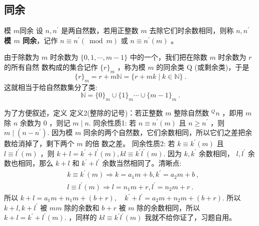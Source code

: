 
\subsection{同余}
\begin{definition}{模 $m$同余}
设 $n, n^{\prime}$ 是两自然数，若用正整数 $m$ 去除它们时余数相同，则称 $n, n^{\prime}$ \textbf{模 $m$ 同余}，记作 $n \equiv n^{\prime}(\bmod m)$ 或 $n \equiv n^{\prime}(m)$ 。 
\end{definition} 
由于除数为 $m$ 时余数为 $\{0,1, \cdots, m-1\}$ 中的一个，我们把在除数 $m$ 时余数为 $r$ 的所有自然 数构成的集合记作 $\{r\}_m$ ，称为模 $m$ 的同余类 $\mathrm{Q}$ (或剩余类)，于是
\begin{equation}
\{r\}_m=r+m \mathbb{N}=\{r+m k \mid k \in \mathbb{N}\}~.
\end{equation}
这就相当于给自然数集分了类:
\begin{equation}
\mathbb{N}=\{0\}_m \cup\{1\}_m \cdots \cup\{m-1\}_m~.
\end{equation}

为了方便叙述，定义
定义2(整除的记号)：若正整数 $m$ 整除自然数 ${ }^Q n$ ，即用 $m$ 除 $n$ 余数为 0 ，则记 $m \mid n$.
同余性质1: 若 $n \equiv n^{\prime}(m)$ 且 $n \geq n^{\prime}$ ，则 $m \mid\left(n-n^{\prime}\right)$.
因为模 $m$ 同余的两个自然数，它们余数相同，所以它们之差把余数给消掉了，剩下两个 $m$ 的倍 数之差。
同余性质2: 若 $k \equiv k^{\prime}(m)$ 且 $l \equiv l^{\prime}(m)$ ，则 $k+l=k^{\prime}+l^{\prime}(m), k l \equiv k^{\prime} l^{\prime}(m)$.
因为 $k, k^{\prime}$ 余数相同， $l, l^{\prime}$ 余数也相同，那么 $k+l$ 和 $k^{\prime}+l^{\prime}$ 余数当然相同了。清晰点:
\begin{equation}
\begin{aligned}
& k \equiv k^{\prime}(m) \Rightarrow k=a_1 m+b, k^{\prime}=a_2 m+b~, \\
& l \equiv l^{\prime}(m) \Rightarrow l=n_1 m+r, l^{\prime}=n_2 m+r~.
\end{aligned}
\end{equation}
所以 $k+l=a_1 m+n_1 m+(b+r), \quad k^{\prime}+l^{\prime}=a_2 m+n_2 m+(b+r).$
所以 $k+l, k+l^{\prime}$ 被 $m m$ 除的余数和 $b+r$ 被 $m$ 除的余数相同，所以 $k+l=k^{\prime}+l^{\prime}(m).$
，同样的 $k l \equiv k^{\prime} l^{\prime}(m)$ 我就不给你证了，习题自用。